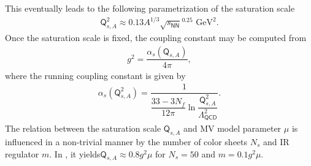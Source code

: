 This eventually leads to the following parametrization of the saturation scale
\begin{align*}
    \textsf{Q}_{s,A}^2\approx 0.13 A^{1/3} \sqrt{s_{\textsf{NN}}} ^{0.25} \text{ GeV}^{2}.
\end{align*}
Once the saturation scale is fixed, the coupling constant may be computed from
\begin{align*}
    g^2=\dfrac{\alpha_s(\textsf{Q}_{s,A})}{4\pi},
\end{align*}
where the running coupling constant is given by
\begin{align*}
    \alpha_{s}(\textsf{Q}_{s,A}^{2})=\dfrac{1}{\dfrac{33-3N_f}{12\pi} \ln{\dfrac{\textsf{Q}_{s,A}^{2}}{\Lambda_{\textsf{QCD}}^{2}}}}.
\end{align*}
The relation between the saturation scale $\textsf{Q}_{s,A}$ and {\sffamily MV} model parameter $\mu$ is influenced in a non-trivial manner by the number of color sheets $N_s$ and {\sffamily IR} regulator $m$. In \cite{lappidis}, it yields$\textsf{Q}_{s,A}\approx 0.8g^2\mu$ for $N_s=50$ and $m=0.1g^2\mu$.


